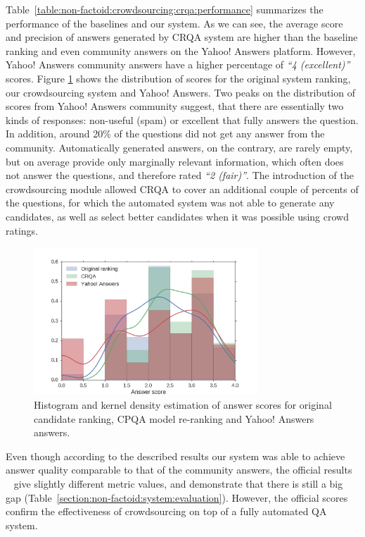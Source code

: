 Table~\ref{table:non-factoid:crowdsourcing:crqa:performance} summarizes the performance of the baselines and our system.
As we can see, the average score and precision of answers generated by CRQA system are higher than the baseline ranking and even community answers on the Yahoo! Answers platform.
However, Yahoo! Answers community answers have a higher percentage of \textit{``4 (excellent)''} scores.
Figure \ref{figure:non-factoid:crowdsourcing:crqa:score_histogram} shows the distribution of scores for the original system ranking, our crowdsourcing system and Yahoo! Answers.
Two peaks on the distribution of scores from Yahoo! Answers community suggest, that there are essentially two kinds of responses: non-useful (\eg spam) or excellent that fully answers the question.
In addition, around 20\% of the questions did not get any answer from the community.
Automatically generated answers, on the contrary, are rarely empty, but on average provide only marginally relevant information, which often does not answer the questions, and therefore rated \textit{``2 (fair)''}.
The introduction of the crowdsourcing module allowed CRQA to cover an additional couple of percents of the questions, for which the automated system was not able to generate any candidates, as well as select better candidates when it was possible using crowd ratings.

\begin{figure}[h]
    \centering
    \includegraphics[width=0.75\textwidth]{img/crqa_score_hist}
    \caption{Histogram and kernel density estimation of answer scores for original candidate ranking, CPQA model re-ranking and Yahoo! Answers answers.}
    \label{figure:non-factoid:crowdsourcing:crqa:score_histogram}
\end{figure}

Even though according to the described results our system was able to achieve answer quality comparable to that of the community answers, the official results ~\cite{overviewliveqa16} give slightly different metric values, and demonstrate that there is still a big gap (Table~\ref{section:non-factoid:system:evaluation}).
However, the official scores confirm the effectiveness of crowdsourcing on top of a fully automated QA system.

